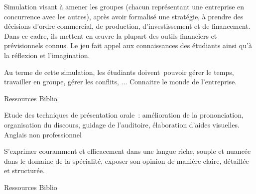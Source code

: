 \documentclass[10pt, a5paper]{report}
\begin{document}
\vfill

{
Simulation visant à amener les groupes (chacun représentant une entreprise en concurrence avec les autres), après avoir formalisé une stratégie, 
à prendre des décisions d'ordre commercial, de production, d'investissement et de financement. Dans ce cadre, ils mettent en \oe uvre la 
plupart des outils financiers et prévisionnels connus. 
} 
{Le jeu fait appel aux connaissances des étudiants ainsi qu'à la réflexion et l'imagination.} 
{\begin{itemize} 
  \ObjItem Au terme de cette simulation, les étudiants doivent pouvoir gérer le temps, travailler en groupe, gérer les conflits, ... 
  \ObjItem Connaitre le monde de l'entreprise.
\end{itemize} 
} 
{Ressources} 
{Biblio} 
 
\vfill

{
Etude des techniques de présentation orale : amélioration de la prononciation, organisation du discours, guidage de l'auditoire, élaboration d'aides visuelles. 
} 
{Anglais non professionnel} 
{\begin{itemize} 
  \ObjItem S'exprimer couramment et efficacement dans une langue riche, souple et nuancée dans le domaine de la spécialité, exposer son opinion de manière claire, détaillée et structurée.
\end{itemize} 
} 
{Ressources} 
{Biblio} 
 
\end{document}
